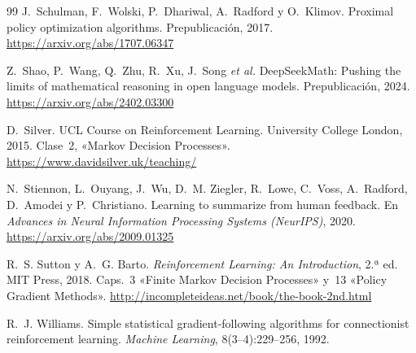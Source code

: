 \begin{thebibliography}{99}
J.~Schulman, F.~Wolski, P.~Dhariwal, A.~Radford y O.~Klimov.
\newblock Proximal policy optimization algorithms.
\newblock Prepublicación, 2017.
\newblock \url{https://arxiv.org/abs/1707.06347}

Z.~Shao, P.~Wang, Q.~Zhu, R.~Xu, J.~Song \emph{et al.}
\newblock DeepSeekMath: Pushing the limits of mathematical reasoning in open language models.
\newblock Prepublicación, 2024.
\newblock \url{https://arxiv.org/abs/2402.03300}

D.~Silver.
\newblock UCL Course on Reinforcement Learning.
\newblock University College London, 2015. Clase~2, «Markov Decision Processes».
\newblock \url{https://www.davidsilver.uk/teaching/}

N.~Stiennon, L.~Ouyang, J.~Wu, D.~M. Ziegler, R.~Lowe, C.~Voss, A.~Radford, D.~Amodei y P.~Christiano.
\newblock Learning to summarize from human feedback.
\newblock En \emph{Advances in Neural Information Processing Systems (NeurIPS)}, 2020.
\newblock \url{https://arxiv.org/abs/2009.01325}

R.~S. Sutton y A.~G. Barto.
\newblock \emph{Reinforcement Learning: An Introduction}, 2.ª ed.
\newblock MIT Press, 2018. Caps.~3 «Finite Markov Decision Processes» y~13 «Policy Gradient Methods».
\newblock \url{http://incompleteideas.net/book/the-book-2nd.html}

R.~J. Williams.
\newblock Simple statistical gradient-following algorithms for connectionist reinforcement learning.
\newblock \emph{Machine Learning}, 8(3--4):229--256, 1992.

\end{thebibliography}
